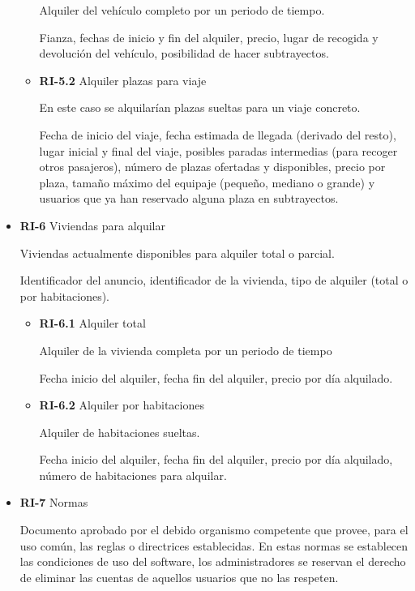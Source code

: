 \documentclass[11pt,spanish]{article} %
\begin{document}
\begin{itemize}
\begin{itemize}
		Alquiler del vehículo completo por un periodo de tiempo.

		Fianza, fechas de inicio y fin del alquiler, precio, lugar de recogida y devolución del vehículo, posibilidad de hacer subtrayectos.

		\item \textbf{RI-5.2} Alquiler plazas para viaje

		En este caso se alquilarían plazas sueltas para un viaje concreto.

		Fecha de inicio del viaje, fecha estimada de llegada (derivado del resto), lugar inicial y final del viaje, posibles paradas intermedias (para recoger otros pasajeros), número de plazas ofertadas y disponibles, precio por plaza, tamaño máximo del equipaje (pequeño, mediano o grande) y usuarios que ya han reservado alguna plaza en subtrayectos.
	\end{itemize}

	\item \textbf{RI-6} Viviendas para alquilar

	Viviendas actualmente disponibles para alquiler total o parcial.

	Identificador del anuncio, identificador de la vivienda, tipo de alquiler (total o por habitaciones).

	\begin{itemize}
		\item \textbf{RI-6.1} Alquiler total

		Alquiler de la vivienda completa por un periodo de tiempo

		Fecha inicio del alquiler, fecha fin del alquiler, precio por día alquilado.

		\item \textbf{RI-6.2} Alquiler por habitaciones

		Alquiler de habitaciones sueltas.

		Fecha inicio del alquiler, fecha fin del alquiler, precio por día alquilado, número de habitaciones para alquilar.
	\end{itemize}

	\item \textbf{RI-7} Normas
	
	Documento aprobado por el debido organismo competente que provee, para el uso común, las reglas o directrices establecidas.
	En estas normas se establecen las condiciones de uso del software, los administradores se reservan el derecho de eliminar las cuentas de aquellos usuarios que no las respeten.
	

\end{itemize}
\end{document}
